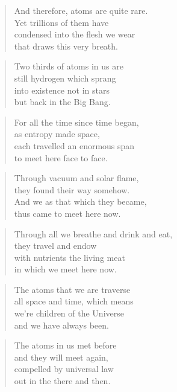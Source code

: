 \documentclass[10pt,a4paper]{article}
\begin{document}
\begin{paracol}{2}
\begin{verse}
And therefore, atoms are quite rare.\\
Yet trillions of them have\\
condensed into the flesh we wear\\
that draws this very breath.
\end{verse}

\begin{verse}
Two thirds of atoms in us are\\
still hydrogen which sprang\\
into existence not in stars\\
but back in the Big Bang.
\end{verse}

\begin{verse}
For all the time since time began,\\
as entropy made space,\\
each travelled an enormous span\\
to meet here face to face.
\end{verse}

\begin{verse}
Through vacuum and solar flame,\\
they found their way somehow.\\
And we as that which they became,\\
thus came to meet here now.
\end{verse}

\begin{verse}
Through all we breathe and drink and eat,\\
they travel and endow\\
with nutrients the living meat\\
in which we meet here now.
\end{verse}

\begin{verse}
The atoms that we are traverse\\
all space and time, which means\\
we’re children of the Universe\\
and we have always been.
\end{verse}

\begin{verse}
The atoms in us met before\\
and they will meet again,\\
compelled by universal law\\
out in the there and then.
\end{verse}


\end{paracol}
\end{document}
